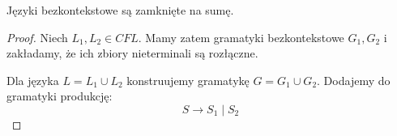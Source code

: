 \begin{theorem}
    Języki bezkontekstowe są zamknięte na sumę.
\end{theorem}
\begin{proof}
    Niech \( L_1, L_2 \in CFL \). Mamy zatem gramatyki bezkontekstowe \( G_1, G_2 \) i zakładamy, że ich zbiory nieterminali są rozłączne.
    
    Dla języka \( L = L_1 \cup L_2 \) konstruujemy gramatykę \( G = G_1 \cup G_2 \).
    Dodajemy do gramatyki produkcję:
    \[
        S \rightarrow S_1 \mid S_2
    \]
\end{proof}